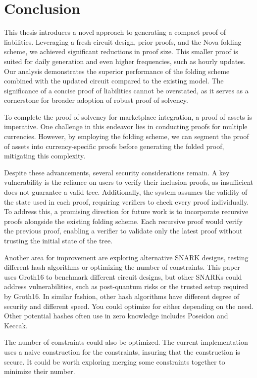 
\chapter{Conclusion}

This thesis introduces a novel approach to generating a compact proof of liabilities. 
Leveraging a fresh circuit design, prior proofs, and the Nova folding scheme, we achieved significant reductions in proof size. 
This smaller proof is suited for daily generation and even higher frequencies, such as hourly updates.
Our analysis demonstrates the superior performance of the folding scheme combined with the updated circuit compared to the existing model. 
The significance of a concise proof of liabilities cannot be overstated, as it serves as a cornerstone for broader adoption of robust proof of solvency.

To complete the proof of solvency for marketplace integration, a proof of assets is imperative. 
One challenge in this endeavor lies in conducting proofs for multiple currencies. 
However, by employing the folding scheme, we can segment the proof of assets into currency-specific proofs before generating the folded proof, mitigating this complexity.

Despite these advancements, several security considerations remain. 
A key vulnerability is the reliance on users to verify their inclusion proofs, as insufficient does not guarantee a valid tree. 
Additionally, the system assumes the validity of the state used in each proof, requiring verifiers to check every proof individually. 
To address this, a promising direction for future work is to incorporate recursive proofs alongside the existing folding scheme. 
Each recursive proof would verify the previous proof, enabling a verifier to validate only the latest proof without trusting the initial state of the tree. 

Another area for improvement are exploring alternative SNARK designs, testing different hash algorithms or optimizing the number of constraints. 
This paper uses Groth16 to benchmark different circuit designs, but other SNARKs could address vulnerabilities, such as post-quantum risks or the trusted setup required by Groth16. 
In similar fashion, other hash algorithms have different degree of security and different speed. You could optimize for either depending on the need. Other potential hashes often use in 
zero knowledge includes Poseidon and Keccak. 

The number of constraints could also be optimized. The current implementation uses a naive construction for the constraints, insuring that the construction is secure. It could be worth exploring merging
some constraints together to minimize their number.

